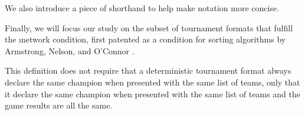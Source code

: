 {    We also introduce a piece of shorthand to help make notation more concise.


    Finally, we will focus our study on the subset of tournament formats that fulfill the \i{network condition}, first patented as a condition for sorting algorithms by Armstrong, Nelson, and O'Connor \cite{pat}.


    This definition does not require that a deterministic tournament format always declare the same champion when presented with the same list of teams, only that it declare the same champion when presented with the same list of teams and the game results are all the same.

}